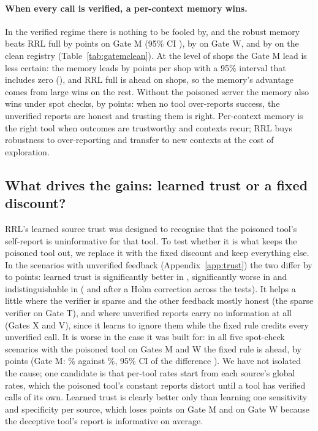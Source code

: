 \documentclass[11pt]{article}
\begin{document}
\paragraph{When every call is verified, a per-context memory wins.} In the verified regime there
is nothing to be fooled by, and the robust memory beats RRL full by \MverRobustLead{} points on
Gate M (95\% CI \MverRobustLeadCI), by \WverLead{} on Gate W, and by \CleanVerLead{} on the clean
registry (Table~\ref{tab:gatemclean}). At the level of shops the Gate M lead is less certain: the
memory leads by \SiteVerLead{} points per shop with a 95\% interval that includes zero
(\SiteVerLeadCI), and RRL full is ahead on \SiteVerWins{} shops, so the memory's advantage comes from
large wins on the rest. Without the poisoned server
the memory also wins under spot checks, by \CleanSpotLead{} points: when no tool over-reports
success, the unverified reports are honest and trusting them is right. Per-context memory is the right tool when outcomes are trustworthy
and contexts recur; RRL buys robustness to over-reporting and transfer to new contexts at the
cost of exploration.




\subsection{What drives the gains: learned trust or a fixed discount?}
\label{sec:trust}

RRL's learned source trust was designed to recognise that the poisoned tool's self-report is
uninformative for that tool. To test whether it is what keeps the poisoned tool out, we replace it
with the fixed discount and keep everything else. In the \TrustN{} scenarios with unverified
feedback (Appendix~\ref{app:trust}) the two differ by \TrustMin{} to \TrustMax{} points: learned
trust is significantly better in \TrustBetter, significantly worse in \TrustWorse{} and
indistinguishable in \TrustSame{} (\TrustHolmBetter{} and \TrustHolmWorse{} after a Holm correction
across the \TrustN{} tests). It helps a little where the verifier is sparse and the other feedback
mostly honest (the sparse verifier on Gate T), and where unverified reports carry no information
at all (Gates X and V), since it learns to ignore them while the fixed rule credits every
unverified call. It is worse in the case it was built for: in all
five spot-check scenarios with the poisoned tool on Gates M and W the fixed rule is ahead, by
\TrustPoisonRange{} points (Gate M: \MspotFixed\% against \MspotRRL\%, 95\% CI of the difference
\MspotFixedLeadCI). We have not isolated the cause; one candidate is that per-tool rates start
from each source's global rates, which the poisoned tool's constant reports distort until a tool
has verified calls of its own. Learned trust is clearly better only than learning one sensitivity
and specificity per source, which loses \MspotGlobalRelLoss{} points on Gate M and
\WspotGlobalRelLoss{} on Gate W because the deceptive tool's report is informative on average.
\end{document}
